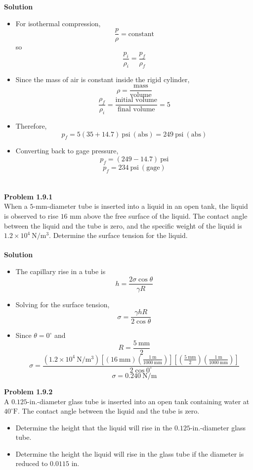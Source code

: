 ﻿\documentclass[12pt]{article}
\begin{document}
\textbf{Solution}
\begin{itemize}
\item For isothermal compression,
\[
\frac{p}{\rho}=\text{constant}
\]
so
\[
\frac{p_i}{\rho_i}=\frac{p_f}{\rho_f}
\]
\item Since the mass of air is constant inside the rigid cylinder,
\[
\rho=\frac{\text{mass}}{\text{volume}}
\]
\[
\frac{\rho_f}{\rho_i}=\frac{\text{initial volume}}{\text{final volume}}=5
\]
\item Therefore,
\[
p_f=5(35+14.7)\ \mathrm{psi\ (abs)}
=249\ \mathrm{psi\ (abs)}
\]
\item Converting back to gage pressure,
\[
p_f=(249-14.7)\ \mathrm{psi}
\]
\[
\boxed{p_f=234\ \mathrm{psi\ (gage)}}
\]
\end{itemize}

\section*{}
\textbf{Problem 1.9.1}\\
When a $5$-mm-diameter tube is inserted into a liquid in an open tank, the liquid is observed to rise $16$ mm above the free surface of the liquid. The contact angle between the liquid and the tube is zero, and the specific weight of the liquid is $1.2\times10^4\ \mathrm{N/m^3}$. Determine the surface tension for the liquid.\\\\
\textbf{Solution}
\begin{itemize}
\item The capillary rise in a tube is
\[
h=\frac{2\sigma\cos\theta}{\gamma R}
\]
\item Solving for the surface tension,
\[
\sigma=\frac{\gamma hR}{2\cos\theta}
\]
\item Since $\theta=0^\circ$ and
\[
R=\frac{5\ \mathrm{mm}}{2}
\]
\[
\sigma=\frac{\left(1.2\times10^4\ \mathrm{N/m^3}\right)\left[(16\ \mathrm{mm})\left(\frac{1\ \mathrm{m}}{1000\ \mathrm{mm}}\right)\right]\left[\left(\frac{5\ \mathrm{mm}}{2}\right)\left(\frac{1\ \mathrm{m}}{1000\ \mathrm{mm}}\right)\right]}{2\cos0^\circ}
\]
\[
\boxed{\sigma=0.240\ \mathrm{N/m}}
\]
\end{itemize}
\textbf{Problem 1.9.2}\\
A $0.125$-in.-diameter glass tube is inserted into an open tank containing water at $40^\circ\mathrm{F}$. The contact angle between the liquid and the tube is zero.
\begin{itemize}
\item[(a)] Determine the height that the liquid will rise in the $0.125$-in.-diameter glass tube.
\item[(b)] Determine the height the liquid will rise in the glass tube if the diameter is reduced to $0.0115$ in.
\end{itemize}
\end{document}
